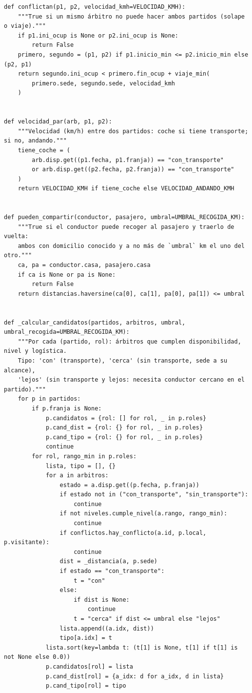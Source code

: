 \documentclass[11pt,a4paper,spanish]{book}
\numberwithin{equation}{chapter}
\numberwithin{figure}{chapter}
\numberwithin{table}{chapter}
\begin{document}
\begin{lstlisting}[caption={\texttt{datos.py} --- solape horario, coche compartido y cálculo de candidatos.}]
def conflictan(p1, p2, velocidad_kmh=VELOCIDAD_KMH):
    """True si un mismo árbitro no puede hacer ambos partidos (solape o viaje)."""
    if p1.ini_ocup is None or p2.ini_ocup is None:
        return False
    primero, segundo = (p1, p2) if p1.inicio_min <= p2.inicio_min else (p2, p1)
    return segundo.ini_ocup < primero.fin_ocup + viaje_min(
        primero.sede, segundo.sede, velocidad_kmh
    )


def velocidad_par(arb, p1, p2):
    """Velocidad (km/h) entre dos partidos: coche si tiene transporte; si no, andando."""
    tiene_coche = (
        arb.disp.get((p1.fecha, p1.franja)) == "con_transporte"
        or arb.disp.get((p2.fecha, p2.franja)) == "con_transporte"
    )
    return VELOCIDAD_KMH if tiene_coche else VELOCIDAD_ANDANDO_KMH


def pueden_compartir(conductor, pasajero, umbral=UMBRAL_RECOGIDA_KM):
    """True si el conductor puede recoger al pasajero y traerlo de vuelta:
    ambos con domicilio conocido y a no más de `umbral` km el uno del otro."""
    ca, pa = conductor.casa, pasajero.casa
    if ca is None or pa is None:
        return False
    return distancias.haversine(ca[0], ca[1], pa[0], pa[1]) <= umbral


def _calcular_candidatos(partidos, arbitros, umbral, umbral_recogida=UMBRAL_RECOGIDA_KM):
    """Por cada (partido, rol): árbitros que cumplen disponibilidad, nivel y logística.
    Tipo: 'con' (transporte), 'cerca' (sin transporte, sede a su alcance),
    'lejos' (sin transporte y lejos: necesita conductor cercano en el partido)."""
    for p in partidos:
        if p.franja is None:
            p.candidatos = {rol: [] for rol, _ in p.roles}
            p.cand_dist = {rol: {} for rol, _ in p.roles}
            p.cand_tipo = {rol: {} for rol, _ in p.roles}
            continue
        for rol, rango_min in p.roles:
            lista, tipo = [], {}
            for a in arbitros:
                estado = a.disp.get((p.fecha, p.franja))
                if estado not in ("con_transporte", "sin_transporte"):
                    continue
                if not niveles.cumple_nivel(a.rango, rango_min):
                    continue
                if conflictos.hay_conflicto(a.id, p.local, p.visitante):
                    continue
                dist = _distancia(a, p.sede)
                if estado == "con_transporte":
                    t = "con"
                else:
                    if dist is None:
                        continue
                    t = "cerca" if dist <= umbral else "lejos"
                lista.append((a.idx, dist))
                tipo[a.idx] = t
            lista.sort(key=lambda t: (t[1] is None, t[1] if t[1] is not None else 0.0))
            p.candidatos[rol] = lista
            p.cand_dist[rol] = {a_idx: d for a_idx, d in lista}
            p.cand_tipo[rol] = tipo


\end{lstlisting}
\end{document}
